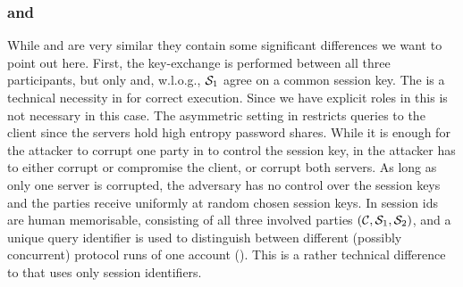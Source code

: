 \subsubsection{\FTWOPAKE and \FPAKE}
While \FPAKE and \FTWOPAKE are very similar they contain some significant differences we want to point out here.
First, the key-exchange is performed between all three participants, but only \Client and, w.l.o.g., $\mathcal{S}_1$ agree on a common session key.
The \role is a technical necessity in \FPAKE for correct execution.
Since we have explicit roles in \FTWOPAKE this is not necessary in this case.
The asymmetric setting in \FTWOPAKE restricts \TestPwd queries to the client since the servers hold high entropy password shares.
While it is enough for the attacker to corrupt one party in \FPAKE to control the session key, in \FTWOPAKE the attacker has to either corrupt or compromise the client, or corrupt both servers.
As long as only one server is corrupted, the adversary has no control over the session 	keys and the parties receive uniformly at random chosen session keys.
In \FTWOPAKE session ids are human memorisable, consisting of all three involved parties $(\mathcal{C}, \mathcal{S}_1, \mathcal{S}_2)$, and a unique query identifier is used to distinguish between different (possibly concurrent) protocol runs of one account (\sid).
This is a rather technical difference to \FPAKE that uses only session identifiers.

	


